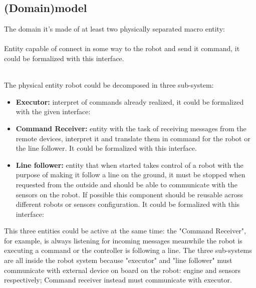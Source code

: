\documentclass{llncs}
\begin{document}

\subsection{(Domain)model}
The domain it's made of at least two physically separated macro entity:\\

\\
Entity capable of connect in some way to the robot and send it command, it could be formalized with this interface.


\\
The physical entity robot could be decomposed in three sub-system:
\begin{itemize}
	\item \textbf{Executor:} interpret of commands already realized, it could be formalized with the given interface:
		
	\item \textbf{Command Receiver:} entity with the task of receiving messages from the remote devices, interpret it and translate them in command for the robot or the line follower. It could be formalized with this interface.
		
	\item \textbf{Line follower:} entity that when started takes control of a robot with the purpose of making it follow a line on the ground, it must be stopped when requested from the outside and should be able to communicate with the sensors on the robot. If possible this component should be reusable across different robots or sensors configuration. It could be formalized with this interface:
		
\end{itemize}
This three entities could be active at the same time: the "Command Receiver", for example, is always listening for incoming messages meanwhile the robot is executing a command or the controller is following a line. The three sub-systems are all inside the robot system because "executor" and "line follower" must communicate with external device on board on the robot: engine and sensors respectively; Command receiver instead must communicate with executor.
\end{document}
